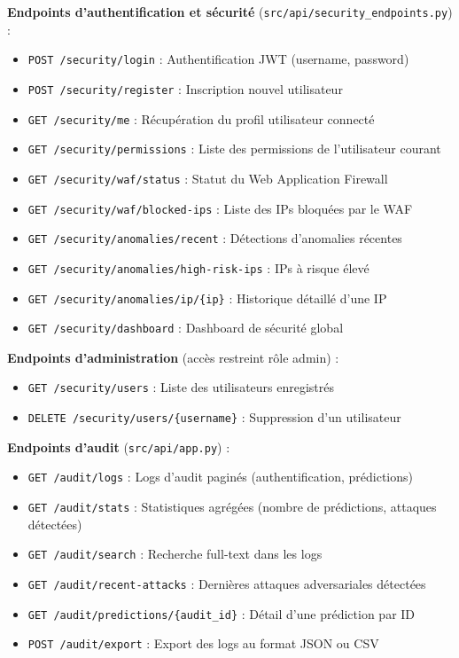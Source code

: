\textbf{Endpoints d'authentification et sécurité} (\texttt{src/api/security\_endpoints.py}) :
\begin{itemize}
    \item \texttt{POST /security/login} : Authentification JWT (username, password)
    \item \texttt{POST /security/register} : Inscription nouvel utilisateur
    \item \texttt{GET /security/me} : Récupération du profil utilisateur connecté
    \item \texttt{GET /security/permissions} : Liste des permissions de l'utilisateur courant
    \item \texttt{GET /security/waf/status} : Statut du Web Application Firewall
    \item \texttt{GET /security/waf/blocked-ips} : Liste des IPs bloquées par le WAF
    \item \texttt{GET /security/anomalies/recent} : Détections d'anomalies récentes
    \item \texttt{GET /security/anomalies/high-risk-ips} : IPs à risque élevé
    \item \texttt{GET /security/anomalies/ip/\{ip\}} : Historique détaillé d'une IP
    \item \texttt{GET /security/dashboard} : Dashboard de sécurité global
\end{itemize}

\textbf{Endpoints d'administration} (accès restreint rôle admin) :
\begin{itemize}
    \item \texttt{GET /security/users} : Liste des utilisateurs enregistrés
    \item \texttt{DELETE /security/users/\{username\}} : Suppression d'un utilisateur
\end{itemize}

\textbf{Endpoints d'audit} (\texttt{src/api/app.py}) :
\begin{itemize}
    \item \texttt{GET /audit/logs} : Logs d'audit paginés (authentification, prédictions)
    \item \texttt{GET /audit/stats} : Statistiques agrégées (nombre de prédictions, attaques détectées)
    \item \texttt{GET /audit/search} : Recherche full-text dans les logs
    \item \texttt{GET /audit/recent-attacks} : Dernières attaques adversariales détectées
    \item \texttt{GET /audit/predictions/\{audit\_id\}} : Détail d'une prédiction par ID
    \item \texttt{POST /audit/export} : Export des logs au format JSON ou CSV
\end{itemize}


